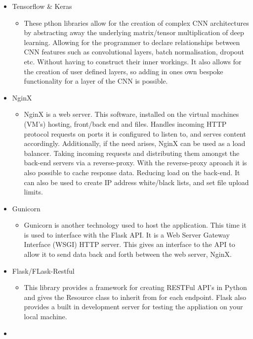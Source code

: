 \begin{itemize}
\begin{itemize}
      \end{itemize}
    \item Tensorflow \& Keras
      \begin{itemize}
        \item These pthon libraries allow for the creation of complex CNN architectures by abstracting away the underlying matrix/tensor multiplication of deep learning. Allowing for the programmer to declare relationships between CNN features such as convolutional layers, batch normalisation, dropout etc. Without having to construct their inner workings. It also allows for the creation of user defined layers, so adding in ones own bespoke functionality for a layer of the CNN is possible.
      \end{itemize}
    \item NginX
      \begin{itemize}
        \item NginX is a web server. This software, installed on the virtual machines (VM's) hosting, front/back end and files. Handles incoming HTTP protocol requests on ports it is configured to listen to, and serves content accordingly. Additionally, if the need arises, NginX can be used as a load balancer. Taking incoming requests and distributing them amongst the back-end servers via a reverse-proxy. With the reverse-proxy aproach it is also possible to cache response data. Reducing load on the back-end. It can also be used to create IP address white/black lists, and set file upload limits.
      \end{itemize}
    \item Gunicorn
      \begin{itemize}
        \item Gunicorn is another technology used to host the application. This time it is used to interface with the Flask API. It is a Web Server Gateway Interface (WSGI) HTTP server. This gives an interface to the API to allow it to send data back and forth between the web server, NginX.
      \end{itemize}
    \item Flask/FLask-Restful
      \begin{itemize}
        \item This library provides a framework for creating RESTFul API's in Python and gives the Resource class to inherit from for each endpoint. Flask also provides a built in development server for testing the appliation on your local machine.
      \end{itemize}
    \item
  \end{itemize}
